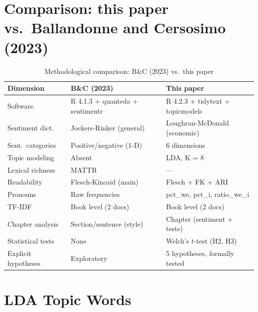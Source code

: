 \documentclass[12pt,a4paper]{article}
\begin{document}



\newpage
\appendix

\section{Comparison: this paper vs.\ Ballandonne and Cersosimo (2023)}
\label{app:compare}

\begin{table}[H]
\centering
\caption{Methodological comparison: B\&C (2023) vs.\ this paper}
\label{tab:compare_bc}
\small
\begin{tabularx}{\textwidth}{lXX}
\toprule
Dimension & B\&C (2023) & This paper \\
\midrule
Software & R 4.1.3 + quanteda + sentimentr & R 4.2.3 + tidytext + topicmodels \\
Sentiment dict. & Jockers-Rinker (general) & Loughran-McDonald (economic) \\
Sent.\ categories & Positive/negative (1-D) & 6 dimensions \\
Topic modeling & Absent & LDA, K = 8 \\
Lexical richness & MATTR & --- \\
Readability & Flesch-Kincaid (main) & Flesch + FK + ARI \\
Pronouns & Raw frequencies & pct\_we, pct\_i, ratio\_we\_i \\
TF-IDF & Book level (2 docs) & Book level (2 docs) \\
Chapter analysis & Section/sentence (style) & Chapter (sentiment + tests) \\
Statistical tests & None & Welch's $t$-test (H2, H3) \\
Explicit hypotheses & Exploratory & 5 hypotheses, formally tested \\
\bottomrule
\end{tabularx}
\end{table}

\section{LDA Topic Words}
\label{app:lda}
\end{document}
